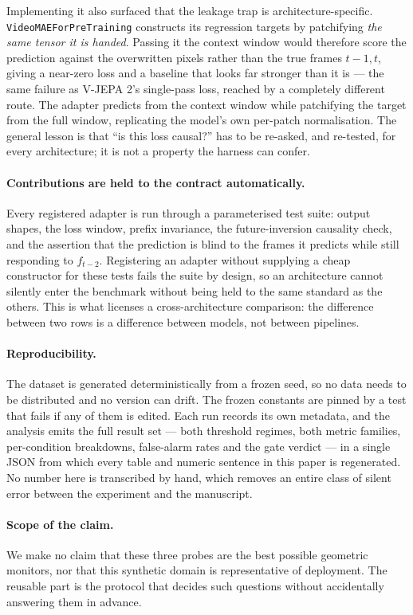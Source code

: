 Implementing it also surfaced that the leakage trap is architecture-specific.
\texttt{VideoMAEForPreTraining} constructs its regression targets by patchifying
\emph{the same tensor it is handed}. Passing it the context window would
therefore score the prediction against the overwritten pixels rather than the
true frames $t{-}1,t$, giving a near-zero loss and a baseline that looks far
stronger than it is --- the same failure as V-JEPA 2's single-pass loss, reached
by a completely different route. The adapter predicts from the context window
while patchifying the target from the full window, replicating the model's own
per-patch normalisation. The general lesson is that ``is this loss causal?'' has
to be re-asked, and re-tested, for every architecture; it is not a property the
harness can confer.

\paragraph{Contributions are held to the contract automatically.}
Every registered adapter is run through a parameterised test suite: output
shapes, the loss window, prefix invariance, the future-inversion causality
check, and the assertion that the prediction is blind to the frames it predicts
while still responding to $f_{t-2}$. Registering an adapter without supplying a
cheap constructor for these tests fails the suite by design, so an architecture
cannot silently enter the benchmark without being held to the same standard as
the others. This is what licenses a cross-architecture comparison: the
difference between two rows is a difference between models, not between
pipelines.

\paragraph{Reproducibility.}
The dataset is generated deterministically from a frozen seed, so no data needs
to be distributed and no version can drift. The frozen constants are pinned by a
test that fails if any of them is edited. Each run records its own metadata, and
the analysis emits the full result set --- both threshold regimes, both metric
families, per-condition breakdowns, false-alarm rates and the gate verdict ---
in a single JSON from which every table and numeric sentence in this paper is
regenerated. No number here is transcribed by hand, which removes an entire
class of silent error between the experiment and the manuscript.

\paragraph{Scope of the claim.}
We make no claim that these three probes are the best possible geometric
monitors, nor that this synthetic domain is representative of deployment. The
reusable part is the protocol that decides such questions without accidentally
answering them in advance.
